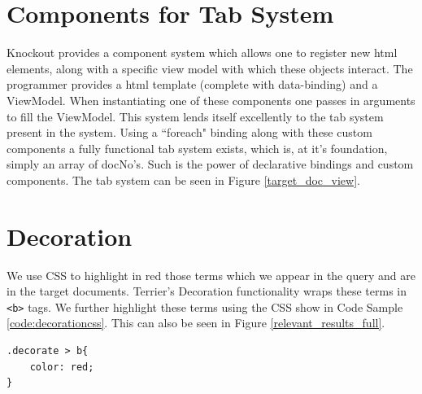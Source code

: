 \documentclass{l4proj}
\newcommand{\code}[1]{\texttt{#1}}
\newenvironment{codelisting}{\captionsetup{type=listing}}{}
\begin{document}
\section{Components for Tab System}
Knockout provides a component system which allows one to register new html elements, along with a specific view model with which these objects interact. The programmer provides a html template (complete with data-binding) and a ViewModel. When instantiating one of these components one passes in arguments to fill the ViewModel.
This system lends itself excellently to the tab system present in the system. Using a ``foreach" binding along with these custom components a fully functional tab system exists, which is, at it's foundation, simply an array of docNo's. Such is the power of declarative bindings and custom components. The tab system can be seen in Figure \ref{target_doc_view}.

\section{Decoration}
We use CSS to highlight in red those terms which we appear in the query and are in the target documents. Terrier's Decoration functionality wraps these terms in \code{<b>} tags. We further highlight these terms using the CSS show in Code Sample \ref{code:decorationcss}. This can also be seen in Figure \ref{relevant_results_full}.
\begin{codelisting}
\begin{verbatim}
.decorate > b{
    color: red;
}
\end{verbatim}
\label{code:decorationcss}
\end{codelisting}
\end{document}
